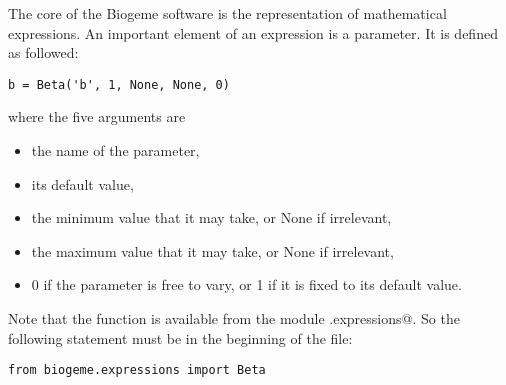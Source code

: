 \documentclass[12pt,a4paper]{article}
\begin{document}
The core of the Biogeme software is the representation of mathematical
expressions.
An important element of an expression is a parameter. It is defined as
followed:

\begin{lstlisting}[style=nonumbers]
b = Beta('b', 1, None, None, 0)
\end{lstlisting}
where the five arguments are
\begin{itemize}
\item the name of the parameter,
\item its default value,
\item the minimum value that it may take, or None if irrelevant,
\item the maximum value that it may take, or None if irrelevant,
  \item 0 if the parameter is free to vary, or 1 if it is fixed to its
    default value.
\end{itemize}
Note that the function \lstinline@Beta@ is available from the module
\lstinline@biogeme.expressions@. So the following statement must be in
the beginning of the file:
\begin{lstlisting}[style=nonumbers]
from biogeme.expressions import Beta
\end{lstlisting}
\end{document}
